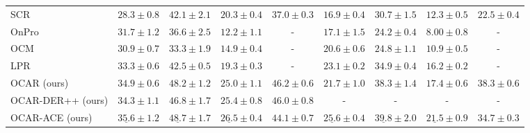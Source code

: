\begin{table*}[t]
{\begin{tabular}{l|cccc|cccc}
    SCR\cite{mai2021supervised} & $28.3 \pm 0.8$ & $42.1 \pm 2.1$ & $20.3 \pm 0.4$ & $37.0 \pm 0.3$ & $16.9 \pm 0.4$ & $30.7 \pm 1.5$ & $12.3 \pm 0.5$ & $22.5 \pm 0.4$ \\
    OnPro & $31.7 \pm 1.2$ & $36.6 \pm 2.5$ & $12.2 \pm 1.1$ & - & $17.1 \pm 1.5$ & $24.2 \pm 0.4$ & $8.00 \pm 0.8$ & - \\
    OCM   & $30.9 \pm 0.7$ & $33.3 \pm 1.9$ & $14.9 \pm0.4$ & - & $20.6 \pm 0.6$ & $24.8 \pm 1.1$  & $10.9 \pm 0.5$ & - \\
    LPR~\cite{yoo2024layerwise} & $33.3 \pm 0.6$ & $42.5 \pm 0.5$ & $19.3 \pm0.3$ & - & $23.1 \pm 0.2$ & $34.9 \pm 0.4$ & $16.2 \pm 0.2$ & - \\
    OCAR (ours) & $\mathbf{34.9} \pm 0.6$ & $\mathbf{48.2} \pm 1.2$ & $\mathbf{25.0} \pm 1.1$ & $\mathbf{46.2} \pm 0.6$ & $21.7 \pm 1.0$ & $\mathbf{38.3} \pm 1.4$ & $\mathbf{17.4} \pm 0.6$ & $\mathbf{38.3} \pm 0.6$ \\
    \midrule
    OCAR-DER++ (ours) & $34.3 \pm 1.1$& $46.8 \pm 1.7$ & $25.4 \pm 0.8$ & $46.0 \pm 0.8$ & - & - & - &- \\
    OCAR-ACE (ours) & $\underline{35.6} \pm 1.2$ & $\underline{48.7} \pm 1.7$ & $\underline{26.5} \pm 0.4$ & $44.1 \pm 0.7$& $\underline{25.6} \pm 0.4$ & $\underline{39.8} \pm 2.0$ & $\underline{21.5} \pm 0.9$ & $34.7 \pm 0.3$\\


\end{tabular}}
\end{table*}
